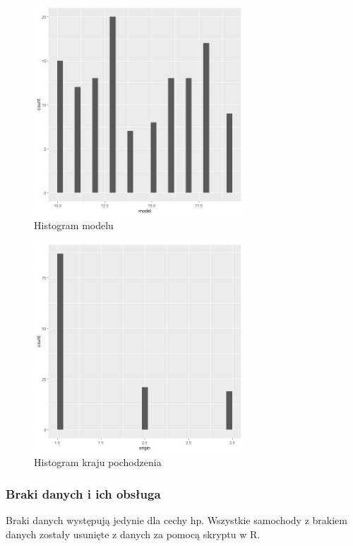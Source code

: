 \documentclass{article}
\begin{document}
            \begin{figure}[H]
                \caption{Histogram modelu}
                \centering
                \includegraphics[width=0.7\textwidth]{../histograms/model_hist.jpeg}
            \end{figure}
            \begin{figure}[H]
                \caption{Histogram kraju pochodzenia}
                \includegraphics[width=0.7\textwidth]{../histograms/origin_hist.jpeg}
            \end{figure}
            
            
            
        \subsubsection*{Braki danych i ich obsługa}
        Braki danych występują jedynie dla cechy hp. Wszystkie samochody z brakiem danych zostały usunięte z danych za pomocą skryptu w R.
\end{document}
